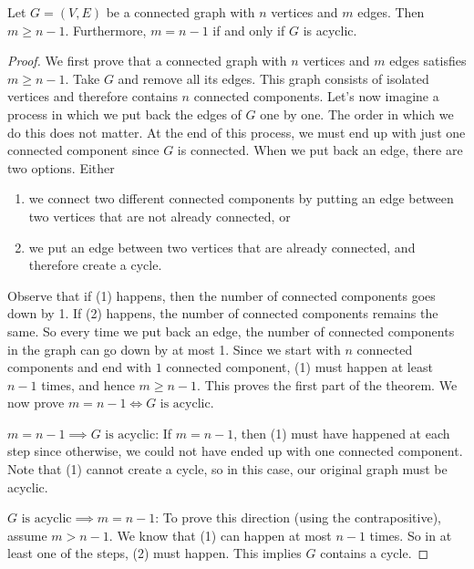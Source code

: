 \begin{flex}
\begin{theorem} \label{theorem:Min-number-of-edges-to-connect-a-graph}
Let $G = (V,E)$ be a connected graph with $n$ vertices and $m$ edges. Then $m \geq n-1$. Furthermore, $m = n-1$ if and only if $G$ is acyclic.
\end{theorem}

\begin{proof}
We first prove that a connected graph with $n$ vertices and $m$ edges satisfies $m \geq n-1$. Take $G$ and remove all its edges. This graph consists of isolated vertices and therefore contains $n$ connected components. Let's now imagine a process in which we put back the edges of $G$ one by one. The order in which we do this does not matter. At the end of this process, we must end up with just one connected component since $G$ is connected. When we put back an edge, there are two options. Either 
\begin{enumerate}
    \item we connect two different connected components by putting an edge between two vertices that are not already connected, or
    \item we put an edge between two vertices that are already connected, and therefore create a cycle.
\end{enumerate}
Observe that if (1) happens, then the number of connected components goes down by 1. If (2) happens, the number of connected components remains the same. So every time we put back an edge, the number of connected components in the graph can go down by at most 1. Since we start with $n$ connected components and end with $1$ connected component, (1) must happen at least $n-1$ times, and hence $m \geq n-1$. This proves the first part of the theorem. We now prove $m = n-1 \Longleftrightarrow  \text{$G$ is acyclic}$.

$m = n-1 \implies \text{$G$ is acyclic}$: If $m = n-1$, then (1) must have happened at each step since otherwise, we could not have ended up with one connected component. Note that (1) cannot create a cycle, so in this case, our original graph must be acyclic. 

$\text{$G$ is acyclic} \implies m = n-1$: To prove this direction (using the contrapositive), assume $m > n-1$. We know that (1) can happen at most $n-1$ times. So in at least one of the steps, (2) must happen. This implies $G$ contains a cycle.
\end{proof}
\end{flex}



